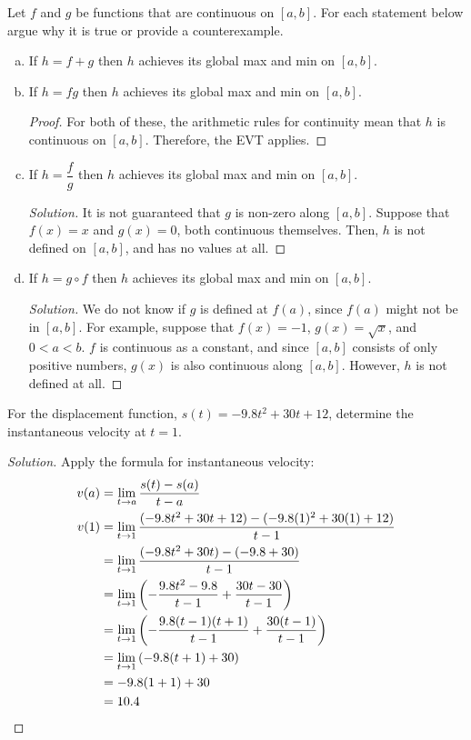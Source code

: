 \question Let $f$ and $g$ be functions that are continuous on $[a,b]$.
For each statement below argue why it is true or provide a counterexample.
\begin{enumerate}[(a)]
  \item If $h=f+g$ then $h$ achieves its global max and min on $[a,b]$.
  \item If $h=fg$ then $h$ achieves its global max and min on $[a,b]$.
        \begin{proof}
          For both of these, the arithmetic rules for continuity mean that $h$ is continuous on $[a,b]$.
          Therefore, the EVT applies.
        \end{proof}
  \item If $h=\dfrac{f}{g}$ then $h$ achieves its global max and min on $[a,b]$.
        \begin{proof}[Solution]
          It is not guaranteed that $g$ is non-zero along $[a,b]$.
          Suppose that $f(x) = x$ and $g(x) = 0$, both continuous themselves.
          Then, $h$ is not defined on $[a,b]$, and has no values at all.
        \end{proof}
  \item If $h=g\circ f$ then $h$ achieves its global max and min on $[a,b]$.
        \begin{proof}[Solution]
          We do not know if $g$ is defined at $f(a)$, since $f(a)$ might not be in $[a,b]$.
          For example, suppose that $f(x)=-1$, $g(x)=\sqrt{x}$, and $0<a<b$.
          $f$ is continuous as a constant, and since $[a,b]$ consists of only positive numbers,
          $g(x)$ is also continuous along $[a,b]$.
          However, $h$ is not defined at all.
        \end{proof}
\end{enumerate}

\question For the displacement function, $s(t)=-9.8t^2+30t+12$, determine the instantaneous velocity at $t=1$.
\begin{proof}[Solution]
  Apply the formula for instantaneous velocity:
  \begin{align*}
    v(a) & = \displaystyle\lim_{t\to a} \frac{s(t) - s(a)}{t-a}                                         \\
    v(1) & = \displaystyle\lim_{t\to1} \frac{(-9.8t^2 + 30t + 12) - (-9.8(1)^2 + 30(1) + 12)}{t-1}     \\
         & = \displaystyle\lim_{t\to1} \frac{(-9.8t^2 + 30t) - (-9.8 + 30)}{t-1}                       \\
         & = \displaystyle\lim_{t\to1} \left( -\frac{9.8t^2-9.8}{t-1} + \frac{30t-30}{t-1} \right)     \\
         & = \displaystyle\lim_{t\to1} \left( -\frac{9.8(t-1)(t+1)}{t-1} + \frac{30(t-1)}{t-1} \right) \\
         & = \displaystyle\lim_{t\to1} \left( -9.8(t+1) + 30 \right)                                   \\
         & = -9.8(1+1) + 30                                                              \\
         & = 10.4 \qedhere
  \end{align*}
\end{proof}

